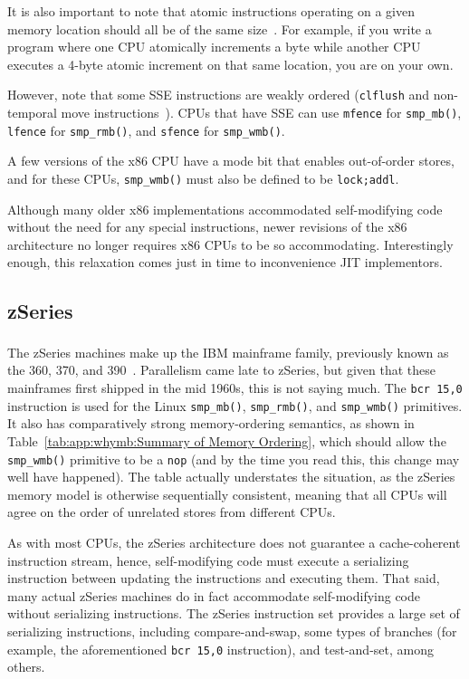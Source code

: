 It is also important to note that atomic instructions operating
on a given memory location should all be of the same
size~\cite[Section 8.1.2.2]{Intel64IA32v3A2011}.
For example, if you write a program where one CPU atomically increments
a byte while another CPU executes a 4-byte atomic increment on
that same location, you are on your own.

However, note that some SSE instructions are weakly ordered ({\tt clflush}
and non-temporal move instructions~\cite{IntelXeonV2b-96a}).
CPUs that have SSE can use {\tt mfence} for {\tt smp\_mb()},
{\tt lfence} for {\tt smp\_rmb()}, and {\tt sfence} for {\tt smp\_wmb()}.

A few versions of the x86 CPU have a mode bit that enables out-of-order
stores, and for these CPUs, {\tt smp\_wmb()} must also be defined to
be {\tt lock;addl}.

Although many older x86 implementations accommodated self-modifying
code without the need for any special instructions, newer revisions of
the x86 architecture no longer requires x86 CPUs to be so accommodating.
Interestingly enough, this relaxation comes just in time to inconvenience
JIT implementors.

\subsection{zSeries}

The zSeries machines make up the IBM\textsuperscript{\texttrademark}
mainframe family, previously
known as the 360, 370, and 390~\cite{IBMzSeries04a}.
Parallelism came late to zSeries, but given that these mainframes first
shipped in the mid 1960s, this is not saying much.
The {\tt bcr 15,0} instruction is used for the Linux {\tt smp\_mb()},
{\tt smp\_rmb()}, and {\tt smp\_wmb()} primitives.
It also has comparatively strong memory-ordering semantics, as shown in
Table~\ref{tab:app:whymb:Summary of Memory Ordering}, which should allow the
{\tt smp\_wmb()} primitive to be a {\tt nop} (and by the time you read this,
this change may well have happened).
The table actually understates the situation, as the zSeries memory model
is otherwise sequentially consistent, meaning that all CPUs
will agree on the order of unrelated stores from different CPUs.

As with most CPUs, the zSeries architecture does not guarantee a
cache-coherent instruction stream, hence,
self-modifying code must execute a serializing instruction between updating
the instructions and executing them.
That said, many actual zSeries machines do in fact accommodate self-modifying
code without serializing instructions.
The zSeries instruction set provides a large set of serializing instructions,
including compare-and-swap, some types of branches (for example, the
aforementioned {\tt bcr 15,0} instruction), and test-and-set,
among others.

